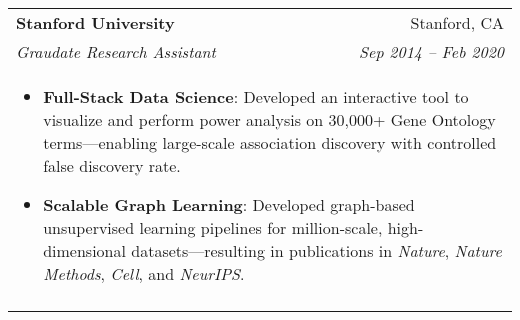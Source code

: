\documentclass[letterpaper,11pt]{article}
\begin{document}
\begin{tabular*}{0.97\textwidth}[t]{l@{\extracolsep{\fill}}r}
  \textbf{Stanford University} & Stanford, CA \\
  \textit{\small Graudate Research Assistant} & \textit{\small Sep 2014 -- Feb 2020} \\
  \multicolumn{2}{l}{
    \begin{minipage}{\textwidth}
      \vspace{0.3em}
      \begin{itemize}[leftmargin=*, itemsep=-4.5pt, topsep=0pt, label={\raisebox{0.4ex}{\tiny\textbullet}}]
        \item \textbf{Full-Stack Data Science}: Developed an interactive tool to visualize and perform power analysis on 30,000+ Gene Ontology terms—enabling large-scale association discovery with controlled false discovery rate.
        \item {\bf Scalable Graph Learning}: Developed graph-based unsupervised learning pipelines for million-scale, high-dimensional datasets—resulting in publications in {\it Nature}, {\it Nature Methods}, {\it Cell}, and {\it NeurIPS}.     
      \end{itemize}
    \end{minipage}
  } \\
  \noalign{\vspace{0.7em}}

\end{tabular*}

\end{document}
